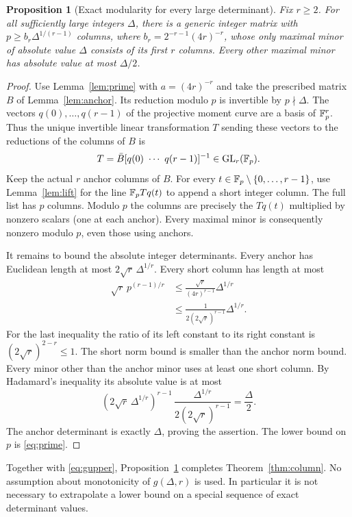 \documentclass[11pt]{article}
\newtheorem{proposition}[theorem]{Proposition}
\theoremstyle{remark}\newtheorem{remark}[theorem]{Remark}
\begin{document}
\begin{proposition}[Exact modularity for every large determinant]\label{prop:exact}
Fix $r\ge2$. For all sufficiently large integers $\Delta$, there is a generic integer matrix with $p\ge b_r\Delta^{1/(r-1)}$ columns, where $b_r=2^{-r-1}(4r)^{-r}$, whose only maximal minor of absolute value $\Delta$ consists of its first $r$ columns. Every other maximal minor has absolute value at most $\Delta/2$.
\end{proposition}
\begin{proof}
Use Lemma~\ref{lem:prime} with $a=(4r)^{-r}$ and take the prescribed matrix $B$ of Lemma~\ref{lem:anchor}. Its reduction modulo $p$ is invertible by $p\nmid\Delta$. The vectors $q(0),\ldots,q(r-1)$ of the projective moment curve are a basis of $\mathbb F_p^r$. Thus the unique invertible linear transformation $T$ sending these vectors to the reductions of the columns of $B$ is
\[
 T=\bar B[q(0)\ \cdots\ q(r-1)]^{-1}\in\mathrm{GL}_r(\F_p).
\]
Keep the actual $r$ anchor columns of $B$. For every $t\in\mathbb F_p\setminus\{0,\ldots,r-1\}$, use Lemma~\ref{lem:lift} for the line $\mathbb F_p Tq(t)$ to append a short integer column. The full list has $p$ columns. Modulo $p$ the columns are precisely the $Tq(t)$ multiplied by nonzero scalars (one at each anchor). Every maximal minor is consequently nonzero modulo $p$, even those using anchors.

It remains to bound the absolute integer determinants. Every anchor has Euclidean length at most $2\sqrt r\,\Delta^{1/r}$. Every short column has length at most
\begin{align*}
 \sqrt r\,p^{(r-1)/r}
 &\le \frac{\sqrt r}{(4r)^{r-1}}\Delta^{1/r}\\
 &\le \frac{1}{2(2\sqrt r)^{r-1}}\Delta^{1/r}.
\end{align*}
For the last inequality the ratio of its left constant to its right constant is $(2\sqrt r)^{2-r}\le1$. The short norm bound is smaller than the anchor norm bound. Every minor other than the anchor minor uses at least one short column. By Hadamard's inequality its absolute value is at most
\[
 (2\sqrt r\,\Delta^{1/r})^{r-1}\,\frac{\Delta^{1/r}}{2(2\sqrt r)^{r-1}}=\frac{\Delta}{2}.
\]
The anchor determinant is exactly $\Delta$, proving the assertion. The lower bound on $p$ is \eqref{eq:prime}.
\end{proof}

Together with \eqref{eq:gupper}, Proposition~\ref{prop:exact} completes Theorem~\ref{thm:column}. No assumption about monotonicity of $g(\Delta,r)$ is used. In particular it is not necessary to extrapolate a lower bound on a special sequence of exact determinant values.
\end{document}
